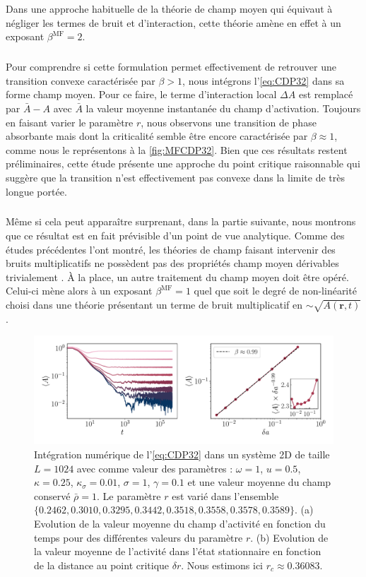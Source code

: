 \noindent Dans une approche habituelle de la théorie de champ moyen qui équivaut à négliger les termes de bruit et d'interaction, cette théorie amène en effet à un exposant $\beta^\text{MF} = 2$.

\subparagraph{}Pour comprendre si cette formulation permet effectivement de retrouver une transition convexe caractérisée par $\beta > 1$, nous intégrons l'\autoref{eq:CDP32} dans sa forme champ moyen. Pour ce faire, le terme d'interaction local $\Delta A$ est remplacé par $\bar{A}-A$ avec $\bar{A}$ la valeur moyenne instantanée du champ d'activation. Toujours en faisant varier le paramètre $r$, nous observons une transition de phase absorbante mais dont la criticalité semble être encore caractérisée par $\beta \approx 1$, comme nous le représentons à la \autoref{fig:MFCDP32}. Bien que ces résultats restent préliminaires, cette étude présente une approche du point critique raisonnable qui suggère que la transition n'est effectivement pas convexe dans la limite de très longue portée.

\subparagraph{}Même si cela peut apparaître surprenant, dans la partie suivante, nous montrons que ce résultat est en fait prévisible d'un point de vue analytique. Comme des études précédentes l'ont montré, les théories de champ faisant intervenir des bruits multiplicatifs ne possèdent pas des propriétés champ moyen dérivables trivialement \cite{munoz_mean_field_2005, munoz_multiplicative_2003}. \`A la place, un autre traitement du champ moyen doit être opéré. Celui-ci mène alors à un exposant $\beta^\text{MF} = 1$ quel que soit le degré de non-linéarité choisi dans une théorie présentant un terme de bruit multiplicatif en $\sim \sqrt{A(\mathbf{r}, t)}$.

\begin{figure}[h]
	\centering
	\includegraphics[width=\textwidth]{Chapitre5/Figures/MFCDP32.pdf}
	\caption{Intégration numérique de l'\autoref{eq:CDP32} dans un système 2D de taille $L=1024$ avec comme valeur des paramètres : $\omega = 1$, $u = 0.5$, $\kappa = 0.25$, $\kappa_\sigma = 0.01$, $\sigma = 1$, $\gamma = 0.1$ et une valeur moyenne du champ conservé $\bar{\rho} = 1$. Le paramètre $r$ est varié dans l'ensemble $\{ 0.2462, 0.3010, 0.3295, 0.3442, 0.3518, 0.3558, 0.3578, 0.3589\}$. (a) Evolution de la valeur moyenne du champ d'activité en fonction du temps pour des différentes valeurs du paramètre $r$. (b) Evolution de la valeur moyenne de l'activité dans l'état stationnaire en fonction de la distance au point critique $\delta r$. Nous estimons ici $r_c \approx 0.36083$.}
	\label{fig:MFCDP32}
\end{figure}

